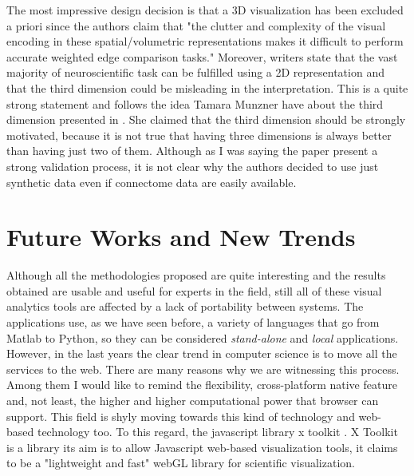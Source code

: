 \documentclass{article}
\begin{document}
\begin{multicols}{2}
The most impressive design decision is that a 3D visualization has been excluded a priori since the authors claim that "the clutter and complexity of the visual encoding in these spatial/volumetric representations makes it difficult to perform accurate weighted edge comparison tasks." Moreover, writers state that the vast majority of neuroscientific task can be fulfilled using a 2D representation and that the third dimension could be misleading in the interpretation. This is a quite strong statement and follows the idea Tamara Munzner have about the third dimension presented in \cite{processAndPitfalls}. She claimed that the third dimension should be strongly motivated, because it is not true that having three dimensions is always better than having just two of them. Although as I was saying the paper present a  strong validation process, it is not clear why the authors decided to use just synthetic data even if connectome data are easily available.


\section{Future Works and New Trends}
Although all the methodologies proposed are quite interesting and the results obtained are usable and useful for experts in the field, still all of these visual analytics tools are affected by a lack of portability between systems. The applications use, as we have seen before, a variety of languages that go from Matlab to Python, so they can be considered \textit{stand-alone} and \textit{local} applications. However, in the last years the clear trend in computer science is to move all the services to the web. There are many reasons why we are witnessing this process. Among them I would like to remind the flexibility, cross-platform native feature and, not least, the higher and higher computational power that browser can support. This field is shyly moving towards this kind of technology and web-based technology too. To this regard, the javascript library x toolkit \cite{xToolkit}.  X Toolkit is a library its aim is to allow Javascript web-based visualization tools, it claims to be a "lightweight and fast" webGL library for scientific visualization. 

{}
  





\end{multicols}
\end{document}
